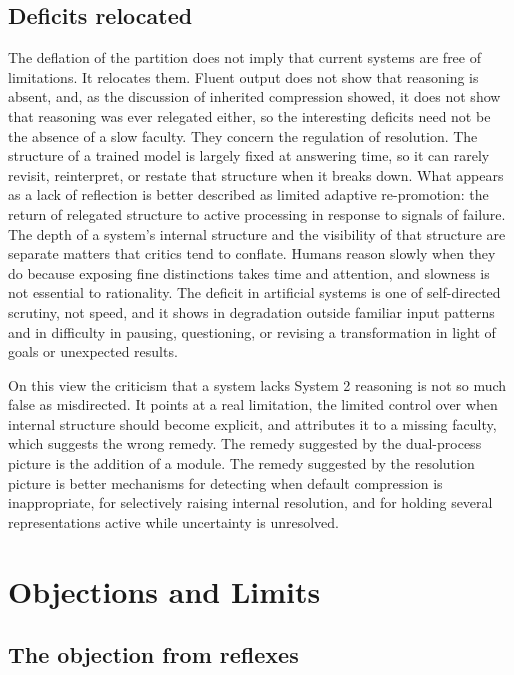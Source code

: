 \documentclass[11pt]{report}
\theoremstyle{remark}
\theoremstyle{definition}
\begin{document}
\section{Deficits relocated}

The deflation of the partition does not imply that current systems are free of limitations. It relocates them. Fluent output does not show that reasoning is absent, and, as the discussion of inherited compression showed, it does not show that reasoning was ever relegated either, so the interesting deficits need not be the absence of a slow faculty. They concern the regulation of resolution. The structure of a trained model is largely fixed at answering time, so it can rarely revisit, reinterpret, or restate that structure when it breaks down. What appears as a lack of reflection is better described as limited adaptive re-promotion: the return of relegated structure to active processing in response to signals of failure. The depth of a system's internal structure and the visibility of that structure are separate matters that critics tend to conflate. Humans reason slowly when they do because exposing fine distinctions takes time and attention, and slowness is not essential to rationality. The deficit in artificial systems is one of self-directed scrutiny, not speed, and it shows in degradation outside familiar input patterns and in difficulty in pausing, questioning, or revising a transformation in light of goals or unexpected results.

On this view the criticism that a system lacks System 2 reasoning is not so much false as misdirected. It points at a real limitation, the limited control over when internal structure should become explicit, and attributes it to a missing faculty, which suggests the wrong remedy. The remedy suggested by the dual-process picture is the addition of a module. The remedy suggested by the resolution picture is better mechanisms for detecting when default compression is inappropriate, for selectively raising internal resolution, and for holding several representations active while uncertainty is unresolved.

\chapter{Objections and Limits}\label{ch:objections}

\section{The objection from reflexes}
\end{document}
